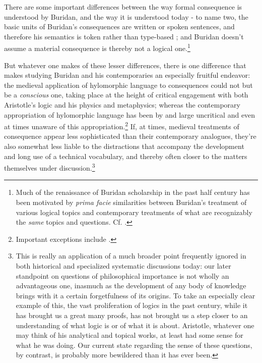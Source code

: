 \documentclass[]{article}
\begin{document}
There are some important differences between the way formal consequence is understood by Buridan, and the way it is understood today - to name two, the basic units of Buridan's consequences are written or spoken sentences, and therefore his semantics is token rather than type-based \cite{Klima2004} \cite{DutilhNovaes2005}; and Buridan doesn't assume a material consequence is thereby not a logical one.\footnote{Much of the renaissance of Buridan scholarship in the past half century has been motivated by \textit{prima facie} similarities between Buridan's treatment of various logical topics and contemporary treatments of what are recognizably the \textit{same} topics and questions. Cf. \cite{Moody1952} \cite{Bochenski1956} \cite{Kretzmann1982} \cite[esp. 164-176]{Parsons2014}.}

But whatever one makes of these lesser differences, there is one difference that makes studying Buridan and his contemporaries an especially fruitful endeavor: the medieval application of hylomorphic language to consequences could not but be a \textit{conscious} one, taking place at the height of critical engagement with both Aristotle's logic and his physics and metaphysics; whereas the contemporary appropriation of hylomorphic language has been by and large uncritical and even at times unaware of this appropriation.\footnote{Important exceptions include \cite{Read1994} \cite{Read1995} \cite{MacFarlane2000} \cite{DutilhNovaes2011} \cite{DutilhNovaes2012a} \cite{DutilhNovaes2012b} \cite{DutilhNovaes2012c}.} If, at times, medieval treatments of consequence appear less sophisticated than their contemporary analogues, they're also somewhat less liable to the distractions that accompany the development and long use of a technical vocabulary, and thereby often closer to the matters themselves under discussion.\footnote{This is really an application of a much broader point frequently ignored in both historical and specialized systematic discussions today: our later standpoint on questions of philosophical importance is not wholly an advantageous one, inasmuch as the development of any body of knowledge brings with it a certain forgetfulness of its origins. To take an especially clear example of this, the vast proliferation of logics in the past century, while it has brought us a great many proofs, has not brought us a step closer to an understanding of what logic is or of what it is about. Aristotle, whatever one may think of his analytical and topical works, at least had some sense for what he was doing. Our current state regarding the sense of these questions, by contrast, is probably more bewildered than it has ever been.}
\end{document}
